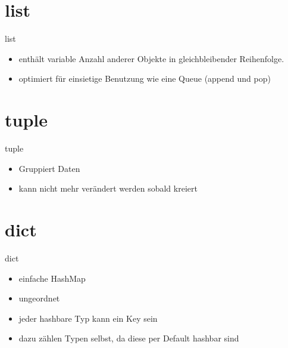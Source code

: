\section{list}
\begin{frame}{list}

\begin{itemize}
	\item enthält variable Anzahl anderer Objekte in gleichbleibender Reihenfolge.
	\item optimiert für einsietige Benutzung wie eine Queue (append und pop)
\end{itemize}
\end{frame}
\begin{frame}{}
	
\end{frame}

\section{tuple}
\begin{frame}{tuple}
\begin{itemize}
	\item Gruppiert Daten
	\item kann nicht mehr verändert werden sobald kreiert
\end{itemize}
\end{frame}
\begin{frame}{}
	
\end{frame}

\section{dict}
\begin{frame}{dict}
\begin{itemize}
	\item einfache HashMap
	\item ungeordnet
	\item jeder hashbare Typ kann ein Key sein
	\item dazu zählen Typen selbst, da diese per Default hashbar sind
\end{itemize}
\end{frame}
\begin{frame}{}

\end{frame}

